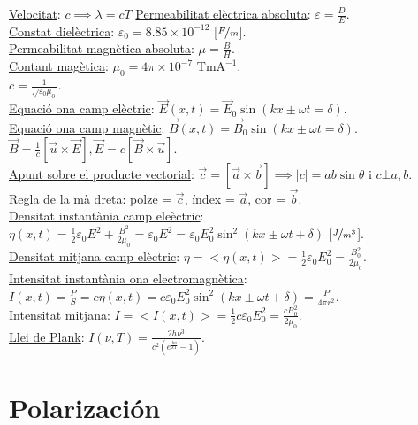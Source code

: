 \documentclass[12pt]{article}
\newcommand{\ci}{\textbullet\;}
\begin{document}
\begin{multicols}{4}
\ul{Velocitat}: $c \implies \lambda = cT$
\ul{Permeabilitat el\`ectrica absoluta}: $\varepsilon = \frac{D}{E}$. \\
\ul{Constat diel\`ectrica}: $\varepsilon_0 = 8.85\times 10^{-12}$ [$\nicefrac{F}{m}$]. \\
\ul{Permeabilitat magn\`etica absoluta}: $\mu = \frac{B}{H}$. \\
\ul{Contant mag\`etica}: $\mu_0 = 4\pi \times 10^{-7}$ Tm$\text{A}^{-1}$. \\
\ci $c = \frac{1}{\sqrt{\varepsilon_0\mu_0}}$. \\
\ul{Equaci\'o ona camp el\`ectric}: $\vec{E}\left( x,t \right) = \vec{E}_0\sin\left( kx \pm \omega t= \delta \right)$. \\
\ul{Equaci\'o ona camp magn\`etic}: $\vec{B}\left( x,t \right) = \vec{B}_0\sin\left( kx \pm \omega t= \delta \right)$. \\
$\vec{B} = \frac{1}{c}\left[ \vec{u} \times \vec{E} \right], \vec{E} = c \left[ \vec{B} \times \vec{u} \right]$. \\
\ul{Apunt sobre el producte vectorial}: $\vec{c} = \left[ \vec{a} \times \vec{b} \right] \implies |c| = ab\sin\theta$ i $c \bot a,b$. \\
\ul{Regla de la m\`a dreta}: polze = $\vec{c}$, \'index = $\vec{a}$, cor = $\vec{b}$. \\
\ul{Densitat instant\`ania camp ele\`ectric}: $\eta\left( x,t \right) = \frac{1}{2}\varepsilon_0 E^2 + \frac{B^2}{2\mu_0} = \varepsilon_0 E^2 = \varepsilon_0 E_0^2\sin^2\left( kx \pm \omega t + \delta \right)$ [$\nicefrac{J}{m^3}$]. \\
\ul{Densitat mitjana camp el\`ectric}: $\eta = <\eta\left( x,t \right)> = \frac{1}{2}\varepsilon_0 E_0^2 = \frac{B_0^2}{2\mu_0}$. \\
\ul{Intensitat instant\`ania ona electromagn\`etica}: $I\left( x,t \right) = \frac{P}{S} = c\eta\left( x,t \right) = c\varepsilon_0 E_0^2\sin^2\left( kx \pm \omega t+ \delta \right) = \frac{P}{4\pi r^2}$. \\
\ul{Intensitat mitjana}: $I = <I\left( x,t \right)> = \frac{1}{2}c\varepsilon_0 E_0^2 = \frac{c B_0^2}{2\mu_0}$. \\
\ul{Llei de Plank}: $I\left( \nu,T \right) = \frac{2h\nu^3}{c^2 (e^{\frac{h\nu}{kT}} - 1)}$.

\section{Polarizaci\'on}



\end{multicols}
\end{document}
